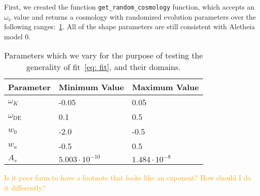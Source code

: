 First, we created the function \verb|get_random_cosmology| function, which
accepts an $\omega_\nu$ value and returns a cosmology with randomized
evolution parameters over the following ranges:~\ref{tab: fit_test_params}.
All of the shape parameters are still consistent with Aletheia model 0.

\begin{table}[ht!]
\centering
\begin{tabular}{l|l|l}
\hline
Parameter & Minimum Value & Maximum Value \\ \hline
$\omega_K$ & -0.05 & 0.05 \\
$\omega_\text{DE}$\footnotemark & 0.1 & 0.5 \\
$w_0$ & -2.0 & -0.5 \\
$w_a$ & -0.5 & 0.5 \\
$A_s$\footnotemark & $5.003 \cdot 10^{-10}$ & $1.484 \cdot 10^{-8}$  \\
\end{tabular}
 \cprotect\caption[Parameter Ranges for Random Test
 	Cosmologies]{Parameters which we vary for the purpose of testing the
 	generality of fit~\ref{eq: fit}, and their domains.}
 \label{tab: fit_test_params}
\end{table}

\textcolor{orange}{Is it poor form to have a footnote that looks like an
 	exponent? How should I do it differently?}

\addtocounter{footnote}{-1}


